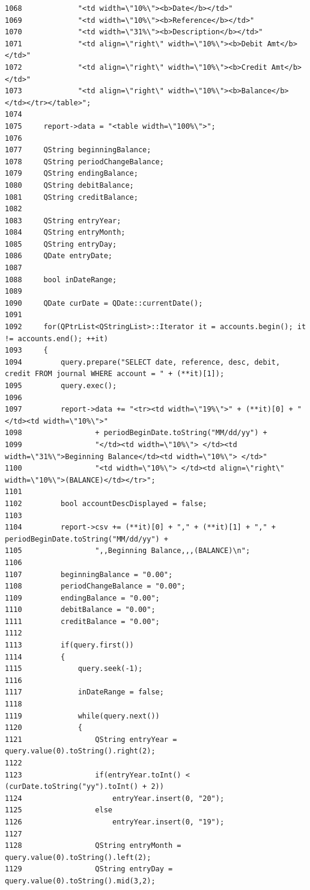\begin{verbatim}
1068             "<td width=\"10%\"><b>Date</b></td>"
1069             "<td width=\"10%\"><b>Reference</b></td>"
1070             "<td width=\"31%\"><b>Description</b></td>"
1071             "<td align=\"right\" width=\"10%\"><b>Debit Amt</b></td>"
1072             "<td align=\"right\" width=\"10%\"><b>Credit Amt</b></td>"
1073             "<td align=\"right\" width=\"10%\"><b>Balance</b></td></tr></table>";
1074 
1075     report->data = "<table width=\"100%\">";
1076     
1077     QString beginningBalance;
1078     QString periodChangeBalance;
1079     QString endingBalance;
1080     QString debitBalance;
1081     QString creditBalance;
1082     
1083     QString entryYear;
1084     QString entryMonth;
1085     QString entryDay;
1086     QDate entryDate;
1087     
1088     bool inDateRange;
1089     
1090     QDate curDate = QDate::currentDate();
1091     
1092     for(QPtrList<QStringList>::Iterator it = accounts.begin(); it != accounts.end(); ++it)
1093     {
1094         query.prepare("SELECT date, reference, desc, debit, credit FROM journal WHERE account = " + (**it)[1]);
1095         query.exec();
1096         
1097         report->data += "<tr><td width=\"19%\">" + (**it)[0] + "</td><td width=\"10%\">"
1098                 + periodBeginDate.toString("MM/dd/yy") +
1099                 "</td><td width=\"10%\"> </td><td width=\"31%\">Beginning Balance</td><td width=\"10%\"> </td>"
1100                 "<td width=\"10%\"> </td><td align=\"right\" width=\"10%\">(BALANCE)</td></tr>";
1101         
1102         bool accountDescDisplayed = false;
1103         
1104         report->csv += (**it)[0] + "," + (**it)[1] + "," + periodBeginDate.toString("MM/dd/yy") +
1105                 ",,Beginning Balance,,,(BALANCE)\n";
1106         
1107         beginningBalance = "0.00";
1108         periodChangeBalance = "0.00";
1109         endingBalance = "0.00";
1110         debitBalance = "0.00";
1111         creditBalance = "0.00";
1112         
1113         if(query.first())
1114         {
1115             query.seek(-1);
1116             
1117             inDateRange = false;
1118             
1119             while(query.next())
1120             {
1121                 QString entryYear = query.value(0).toString().right(2);
1122                     
1123                 if(entryYear.toInt() < (curDate.toString("yy").toInt() + 2))
1124                     entryYear.insert(0, "20");
1125                 else
1126                     entryYear.insert(0, "19");
1127                 
1128                 QString entryMonth = query.value(0).toString().left(2);
1129                 QString entryDay = query.value(0).toString().mid(3,2);

\end{verbatim}
